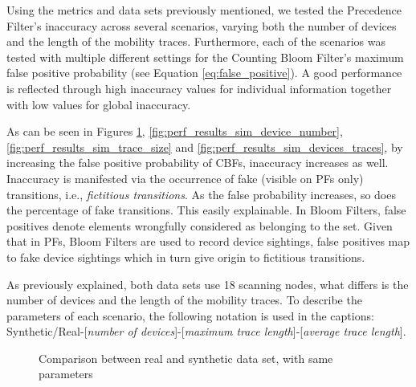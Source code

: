 Using the metrics and data sets previously mentioned, we tested the
Precedence Filter's inaccuracy across several scenarios, varying both
the number of devices and the length of the mobility traces.
Furthermore, each of the scenarios was tested with multiple different
settings for the Counting Bloom Filter's maximum false positive
probability (see Equation \ref{eq:false_positive}).
A good performance is reflected through high inaccuracy values for
individual information together with low values for global inaccuracy.

As can be seen in Figures \ref{fig:perf_results_real_sim},
\ref{fig:perf_results_sim_device_number},
\ref{fig:perf_results_sim_trace_size} and
\ref{fig:perf_results_sim_devices_traces}, by increasing the false
positive probability of CBFs, inaccuracy increases as well.
Inaccuracy is manifested via the occurrence of fake (visible on PFs
only) transitions, i.e., \emph{fictitious transitions}. As the false
probability increases, so does the percentage of fake transitions.
This easily explainable. In Bloom Filters, false positives denote
elements wrongfully considered as belonging to the set.  Given that in
PFs, Bloom Filters are used to record device sightings, false
positives map to fake device sightings which in turn give origin to
fictitious transitions.

As previously explained, both data sets use 18 scanning nodes, what
differs is the number of devices and the length of the mobility
traces. To describe the parameters of each scenario, the following
notation is used in the captions: Synthetic/Real-[\emph{number of
  devices}]-[\emph{maximum trace length}]-[\emph{average trace
  length}].

\begin{figure}[htb]
\centering
{}\hspace*{-0.7em}
\caption{Comparison between real and synthetic data set, with same parameters}
\label{fig:perf_results_real_sim}
\end{figure}


